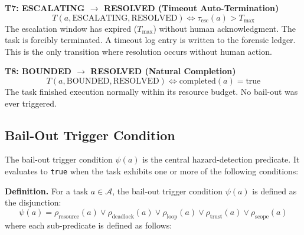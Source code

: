 \medskip\noindent\textbf{T7: ESCALATING $\rightarrow$ RESOLVED (Timeout Auto-Termination)}
\[
T(a, \text{ESCALATING}, \text{RESOLVED}) \iff \tau_\text{esc}(a) > T_\text{max}
\]
The escalation window has expired ($T_\text{max}$) without human acknowledgment. The task is forcibly terminated. A timeout log entry is written to the forensic ledger. This is the only transition where resolution occurs without human action.

\medskip\noindent\textbf{T8: BOUNDED $\rightarrow$ RESOLVED (Natural Completion)}
\[
T(a, \text{BOUNDED}, \text{RESOLVED}) \iff \text{completed}(a) = \text{true}
\]
The task finished execution normally within its resource budget. No bail-out was ever triggered.

\subsection{Bail-Out Trigger Condition}

The bail-out trigger condition $\psi(a)$ is the central hazard-detection predicate. It evaluates to \texttt{true} when the task exhibits one or more of the following conditions:

\medskip
\textbf{Definition.} For a task $a \in \mathcal{A}$, the bail-out trigger condition $\psi(a)$ is defined as the disjunction:
\[
\psi(a) = \rho_\text{resource}(a) \lor \rho_\text{deadlock}(a) \lor \rho_\text{loop}(a) \lor \rho_\text{trust}(a) \lor \rho_\text{scope}(a)
\]
where each sub-predicate is defined as follows:

